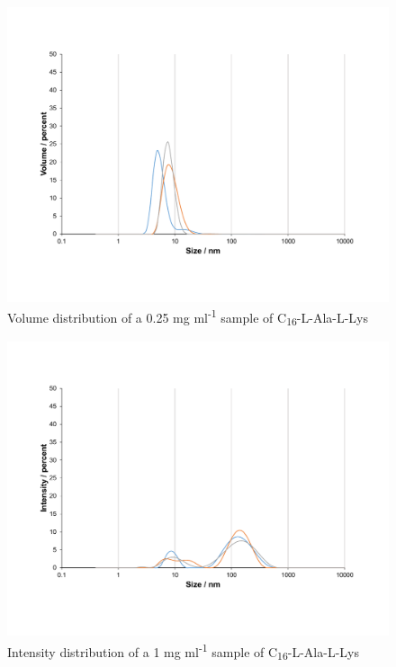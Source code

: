 \begin{figure} [ht!]
\centering
\includegraphics[scale=0.47]{DLS/KAT1_19_0_25mg_ml-1_volume.pdf}
\caption{Volume distribution of a 0.25 mg ml\textsuperscript{-1} sample of C\textsubscript{16}-L-Ala-L-Lys}
\label{volume_0.25_KAT1.19}
\end{figure}

\begin{figure} [ht!]
\centering
\includegraphics[scale=0.47]{DLS/KAT1_19_1_0mg_ml-1_size.pdf}
\caption{Intensity distribution of a 1 mg ml\textsuperscript{-1} sample of C\textsubscript{16}-L-Ala-L-Lys}
\label{intensity_distribution_KAT1.19}
\end{figure}

